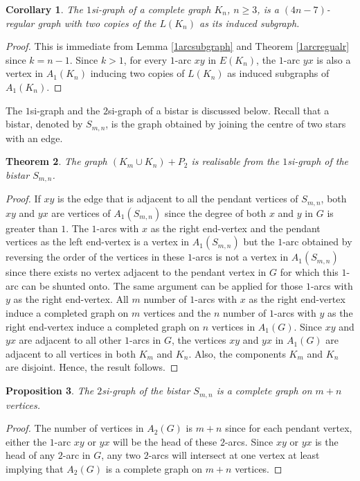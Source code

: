 \documentclass[12pt,a4paper,twoside]{article}
\newtheorem{theorem}{Theorem}[section]
\newtheorem{proposition}[theorem]{Proposition}
\newtheorem{corollary}[theorem]{Corollary}
\theoremstyle{casesty}
\theoremstyle{subcasesty}
\theoremstyle{schemesty}
\begin{document}
\begin{corollary}
	The $1$si-graph of a complete graph $K_{n}$, $n \geq 3$, is a $(4n-7)$-regular graph with two copies of the $L(K_{n})$ as its induced subgraph.
\end{corollary}
\begin{proof}
	This is immediate from Lemma \ref{1arcsubgraph} and Theorem \ref{1arcregualr} since $k=n-1$. Since $k>1$, for every $1$-arc $xy$ in $E(K_{n})$, the $1$-arc $yx$ is also a vertex in $A_{1}(K_{n})$ inducing two copies of $L(K_{n})$ as induced subgraphs of $A_{1}(K_{n})$.
\end{proof}

The $1$si-graph and the $2$si-graph of a bistar is discussed below.  Recall that a bistar, denoted by $S_{m,n}$, is the graph obtained by joining the centre of two stars with an edge.

\begin{theorem}
	The graph $(K_{m} \cup K_{n})+P_{2}$ is realisable from the $1$si-graph of the bistar $S_{m,n}$.
\end{theorem}
\begin{proof}
	If $xy$ is the edge that is adjacent to all the pendant vertices of $S_{m,n}$, both $xy$ and $yx$ are vertices of $A_{1}(S_{m,n})$ since the degree of both $x$ and $y$ in $G$ is greater than $1$. The $1$-arcs with $x$ as the right end-vertex and the pendant vertices as the left end-vertex is a vertex in $A_{1}(S_{m,n})$ but the $1$-arc obtained by reversing the order of the vertices in these $1$-arcs is not a vertex in $A_{1}(S_{m,n})$ since there exists no vertex adjacent to the pendant vertex in $G$ for which this $1$-arc can be shunted onto. The same argument can be applied for those $1$-arcs with $y$ as the right end-vertex. All $m$ number of $1$-arcs with $x$ as the right end-vertex induce a completed graph on $m$ vertices and the $n$ number of $1$-arcs with $y$ as the right end-vertex induce a completed graph on $n$ vertices in $A_{1}(G)$. Since $xy$ and $yx$ are adjacent to all other $1$-arcs in $G$, the vertices $xy$ and $yx$ in $A_{1}(G)$ are adjacent to all vertices in both $K_{m}$ and $K_{n}$. Also, the components $K_{m}$ and $K_{n}$ are disjoint. Hence, the result follows. 
\end{proof}

\begin{proposition}
	The $2$si-graph of the bistar $S_{m,n}$ is a complete graph on $m+n$ vertices.
\end{proposition}
\begin{proof}
	The number of vertices in $A_{2}(G)$ is $m+n$ since for each pendant vertex, either the $1$-arc $xy$ or $yx$ will be the head of these $2$-arcs. Since $xy$ or $yx$ is the head of any $2$-arc in $G$, any two $2$-arcs will intersect at one vertex at least implying that $A_{2}(G)$ is a complete graph on $m+n$ vertices. 
\end{proof}
\end{document}
